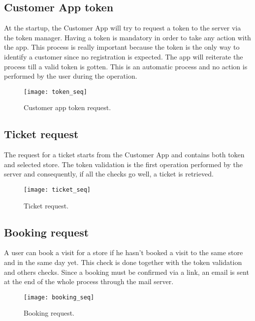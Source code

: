 \subsection{Customer App token}
At the startup, the Customer App will try to request a token to the server via the token manager. Having a token is mandatory in order to take any action with the app.\newline
This process is really important because the token is the only way to identify a customer since no registration is expected. The app will reiterate the process till a valid token is gotten.\newline
This is an automatic process and no action is performed by the user during the operation.
\begin{figure}[H]
	\centering
	\texttt{[image: token\_seq]}
	\caption{Customer app token request.}
	\label{fig:token_seq}
\end{figure}
\clearpage

\subsection{Ticket request}
The request for a ticket starts from the Customer App and contains both token and selected store. The token validation is the first operation performed by the server and consequently, if all the checks go well, a ticket is retrieved.
\vspace{0.1cm}
\begin{figure}[H]
	\centering
	\texttt{[image: ticket\_seq]}
	\caption{Ticket request.}
	\label{fig:ticket_seq}
\end{figure}

\clearpage

\subsection{Booking request}
A user can book a visit for a store if he hasn't booked a visit to the same store and in the same day yet. This check is done together with the token validation and others checks.\newline
Since a booking must be confirmed via a link, an email is sent at the end of the whole process through the mail server.
\begin{figure}[H]
	\centering
	\texttt{[image: booking\_seq]}
	\caption{Booking request.}
	\label{fig:booking_seq}
\end{figure}

